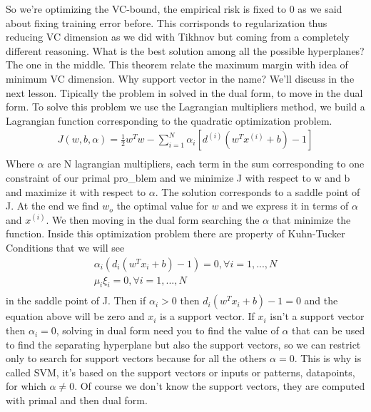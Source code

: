 \documentclass[12pt]{book}
\begin{document}
So we're optimizing the VC-bound, the empirical risk is fixed to 0 as we said about fixing training error before. This corrisponds to regularization thus reducing VC dimension as we did with Tikhnov but coming from a completely different reasoning.\newline
What is the best solution among all the possible hyperplanes? The one in the middle. This theorem relate the maximum margin with idea of minimum VC dimension.
\newline 
Why support vector in the name? We'll discuss in the next lesson.
\newline\newline
Tipically the problem in solved in the dual form, to move in the dual form. \newline
To solve this problem we use the Lagrangian multipliers method, we build a Lagrangian function corresponding to the quadratic optimization problem.
\begin{equation}
\begin{aligned}
	J(w,b,\alpha) = \frac{1}{2}w^Tw - \sum_{i=1}^N \alpha_i[d^{(i)}(w^Tx^{(i)} + b) - 1] \\
\end{aligned}
\end{equation}
Where $\alpha$ are N lagrangian multipliers, each term in the sum corresponding to one constraint of our primal pro_blem and we minimize J with respect to w and b and maximize it with respect to $\alpha$. The solution corresponds to a saddle point of J.
\newline
At the end we find $w_o$ the optimal value for $w$ and we express it in terms of $\alpha$ and $x^{(i)}$.\newline
We then moving in the dual form searching the $\alpha$ that minimize the function.
Inside this optimization problem there are property of Kuhn-Tucker Conditions that we will see
\begin{equation}
	\begin{aligned}
	\alpha_i(d_i(w^Tx_i + b) - 1) = 0, \forall i = 1,...,N \\
	\mu_i\xi_i = 0, \forall i = 1,...,N \\ 
	\end{aligned}
\end{equation}
in the saddle point of J.\newline
Then if $\alpha_i > 0$ then $d_i(w^Tx_i + b) - 1 = 0$ and the equation above will be zero and $x_i$ is a support vector. If $x_i$ isn't a support vector then $\alpha_i = 0$, solving in dual form need you to find the value of $\alpha$ that can be used to find the separating hyperplane but also the support vectors, so we can restrict only to search for support vectors because for all the others $\alpha = 0$. This is why is called SVM, it's based on the support vectors or inputs or patterns, datapoints, for which $\alpha \neq 0$. Of course we don't know the support vectors, they are computed with primal and then dual form.
\end{document}
